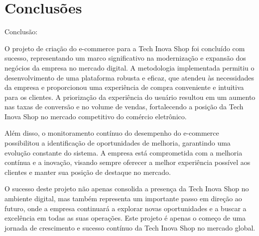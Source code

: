 \chapter{Conclusões}
\label{ch:conclusao}
	Conclusão:

O projeto de criação do e-commerce para a Tech Inova Shop foi concluído com sucesso, representando um marco significativo na modernização e expansão dos negócios da empresa no mercado digital. A metodologia implementada permitiu o desenvolvimento de uma plataforma robusta e eficaz, que atendeu às necessidades da empresa e proporcionou uma experiência de compra conveniente e intuitiva para os clientes. A priorização da experiência do usuário resultou em um aumento nas taxas de conversão e no volume de vendas, fortalecendo a posição da Tech Inova Shop no mercado competitivo do comércio eletrônico.

Além disso, o monitoramento contínuo do desempenho do e-commerce possibilitou a identificação de oportunidades de melhoria, garantindo uma evolução constante do sistema. A empresa está comprometida com a melhoria contínua e a inovação, visando sempre oferecer a melhor experiência possível aos clientes e manter sua posição de destaque no mercado.

O sucesso deste projeto não apenas consolida a presença da Tech Inova Shop no ambiente digital, mas também representa um importante passo em direção ao futuro, onde a empresa continuará a explorar novas oportunidades e a buscar a excelência em todas as suas operações. Este projeto é apenas o começo de uma jornada de crescimento e sucesso contínuo da Tech Inova Shop no mercado global.